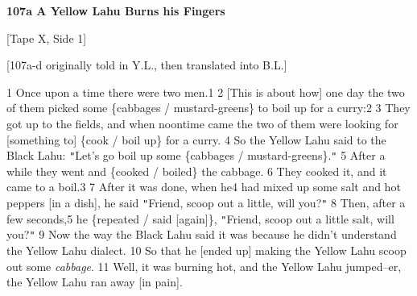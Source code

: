 
\textbf{107a A Yellow Lahu Burns his Fingers}

[Tape X, Side 1]

[107a-d originally told in Y.L., then translated into B.L.]

1 Once upon a time there were two men.1 2 [This is about how] one day the two of
them picked some \{cabbages / mustard-greens\} to boil up for a curry:2 3 They
got up to the fields, and when noontime came the two of them were looking for [something
to] \{cook / boil up\} for a curry. 4 So the Yellow Lahu said to the Black Lahu:
\texttt{"}Let's go boil up some \{cabbages / mustard-greens\}.\texttt{"} 5 After
a while they went and \{cooked / boiled\} the cabbage. 6 They cooked it, and it
came to a boil.3 7 After it was done, when he4 had mixed up some salt and hot peppers
[in a dish], he said \texttt{"}Friend, scoop out a little, will you?\texttt{"}
8 Then, after a few seconds,5 he \{repeated / said [again]\}, \texttt{"}Friend,
scoop out a little salt, will you?\texttt{"} 9 Now the way the Black Lahu said
it was because he didn't understand the Yellow Lahu dialect. 10 So that he [ended
up] making the Yellow Lahu scoop out some \textit{cabbage}. 11 Well, it was burning
hot, and the Yellow Lahu jumped--er, the Yellow Lahu ran away [in pain].

